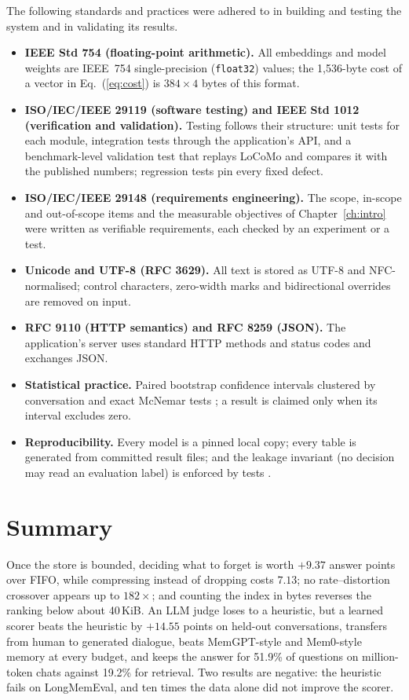 The following standards and practices were adhered to in building and
testing the system and in validating its results.
\begin{itemize}
\item \textbf{IEEE Std 754 (floating-point arithmetic).} All embeddings and
  model weights are IEEE~754 single-precision (\texttt{float32}) values;
  the 1{,}536-byte cost of a vector in Eq.~(\ref{eq:cost}) is $384\times4$
  bytes of this format.
\item \textbf{ISO/IEC/IEEE 29119 (software testing) and IEEE Std 1012
  (verification and validation).} Testing follows their structure: unit
  tests for each module, integration tests through the application's API,
  and a benchmark-level validation test that replays LoCoMo and compares it
  with the published numbers; regression tests pin every fixed defect.
\item \textbf{ISO/IEC/IEEE 29148 (requirements engineering).} The scope,
  in-scope and out-of-scope items and the measurable objectives of
  Chapter~\ref{ch:intro} were written as verifiable requirements, each
  checked by an experiment or a test.
\item \textbf{Unicode and UTF-8 (RFC 3629).} All text is stored as UTF-8 and
  NFC-normalised; control characters, zero-width marks and bidirectional
  overrides are removed on input.
\item \textbf{RFC 9110 (HTTP semantics) and RFC 8259 (JSON).} The
  application's server uses standard HTTP methods and status codes and
  exchanges JSON.
\item \textbf{Statistical practice.} Paired bootstrap confidence intervals
  clustered by conversation \cite{efron1993bootstrap,cameron2008cluster} and
  exact McNemar tests \cite{mcnemar1947,dietterich1998tests}; a result is
  claimed only when its interval excludes zero.
\item \textbf{Reproducibility.} Every model is a pinned local copy; every
  table is generated from committed result files; and the leakage invariant
  (no decision may read an evaluation label) is enforced by tests
  \cite{kaufman2012leakage,kapoor2023leakage}.
\end{itemize}

\section*{Summary}
Once the store is bounded, deciding what to forget is worth $+9.37$ answer
points over FIFO, while compressing instead of dropping costs $7.13$; no
rate--distortion crossover appears up to $182\times$; and counting the index
in bytes reverses the ranking below about 40\,KiB. An LLM judge loses to a
heuristic, but a learned scorer beats the heuristic by $+14.55$ points on
held-out conversations, transfers from human to generated dialogue, beats
MemGPT-style and Mem0-style memory at every budget, and keeps the answer for
51.9\% of questions on million-token chats against 19.2\% for retrieval. Two
results are negative: the heuristic fails on LongMemEval, and ten times the
data alone did not improve the scorer.
